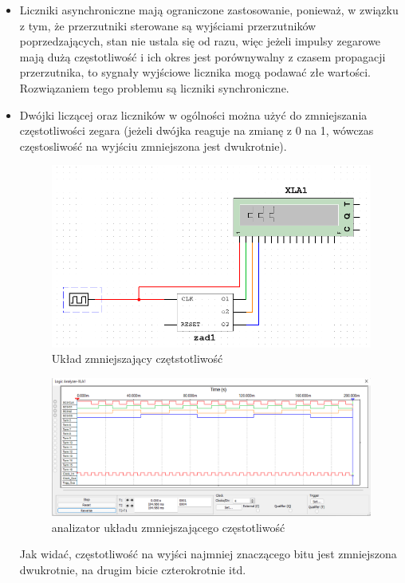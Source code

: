 \documentclass{article}
\begin{document}
\begin{itemize}
    \item
    Liczniki asynchroniczne mają ograniczone zastosowanie, ponieważ, w związku z tym, że przerzutniki sterowane
    są wyjściami przerzutników poprzedzających, 
    stan nie ustala się od razu, więc jeżeli impulsy zegarowe mają dużą częstotliwość i ich okres jest
    porównywalny z czasem propagacji przerzutnika, to sygnały wyjściowe licznika mogą podawać złe wartości.
    Rozwiązaniem tego problemu są liczniki synchroniczne.
    \item
    Dwójki liczącej oraz liczników w ogólności można użyć do zmniejszania częstotliwości zegara (jeżeli dwójka reaguje na
    zmianę z 0 na 1, wówczas częstosliwość na wyjściu zmniejszona jest dwukrotnie).

    \begin{figure}[H]
        \centering
        \includegraphics[width=\textwidth]{3a_przyklad_1.png}
        \caption{Układ zmniejszający czętstotliwość}
    \end{figure}

    \begin{figure}[H]
        \centering
        \includegraphics[width=\textwidth]{3a_przyklad_2.png}
        \caption{analizator układu zmniejszającego częstotliwość}
    \end{figure}

    Jak widać, częstotliwość na wyjści najmniej znaczącego bitu jest zmniejszona dwukrotnie, na drugim bicie czterokrotnie itd.

\end{itemize}
\end{document}
